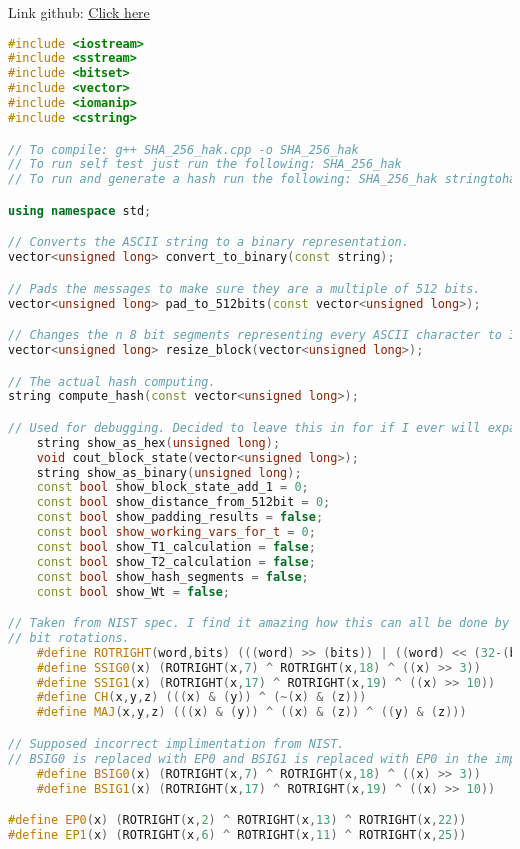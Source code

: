 Link github: \href{https://gist.github.com/hak8or/8794351}{Click here}
\begin{lstlisting}[language = C++]
    #include <iostream>
#include <sstream>
#include <bitset>
#include <vector>
#include <iomanip>
#include <cstring>

// To compile: g++ SHA_256_hak.cpp -o SHA_256_hak
// To run self test just run the following: SHA_256_hak
// To run and generate a hash run the following: SHA_256_hak stringtohashgoeshere

using namespace std;

// Converts the ASCII string to a binary representation.
vector<unsigned long> convert_to_binary(const string);

// Pads the messages to make sure they are a multiple of 512 bits.
vector<unsigned long> pad_to_512bits(const vector<unsigned long>);

// Changes the n 8 bit segments representing every ASCII character to 32 bit words.
vector<unsigned long> resize_block(vector<unsigned long>);

// The actual hash computing.
string compute_hash(const vector<unsigned long>);

// Used for debugging. Decided to leave this in for if I ever will expand on this.
	string show_as_hex(unsigned long);
	void cout_block_state(vector<unsigned long>);
	string show_as_binary(unsigned long);
	const bool show_block_state_add_1 = 0;
	const bool show_distance_from_512bit = 0;
	const bool show_padding_results = false;
	const bool show_working_vars_for_t = 0;
	const bool show_T1_calculation = false;
	const bool show_T2_calculation = false;
	const bool show_hash_segments = false;
	const bool show_Wt = false;

// Taken from NIST spec. I find it amazing how this can all be done by just
// bit rotations.
	#define ROTRIGHT(word,bits) (((word) >> (bits)) | ((word) << (32-(bits))))
	#define SSIG0(x) (ROTRIGHT(x,7) ^ ROTRIGHT(x,18) ^ ((x) >> 3))
	#define SSIG1(x) (ROTRIGHT(x,17) ^ ROTRIGHT(x,19) ^ ((x) >> 10))
	#define CH(x,y,z) (((x) & (y)) ^ (~(x) & (z)))
	#define MAJ(x,y,z) (((x) & (y)) ^ ((x) & (z)) ^ ((y) & (z)))

// Supposed incorrect implimentation from NIST.
// BSIG0 is replaced with EP0 and BSIG1 is replaced with EP0 in the implimentation.
	#define BSIG0(x) (ROTRIGHT(x,7) ^ ROTRIGHT(x,18) ^ ((x) >> 3))
	#define BSIG1(x) (ROTRIGHT(x,17) ^ ROTRIGHT(x,19) ^ ((x) >> 10))

#define EP0(x) (ROTRIGHT(x,2) ^ ROTRIGHT(x,13) ^ ROTRIGHT(x,22))
#define EP1(x) (ROTRIGHT(x,6) ^ ROTRIGHT(x,11) ^ ROTRIGHT(x,25))


\end{lstlisting}
